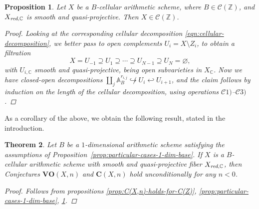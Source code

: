 \documentclass[10pt,a4paper,oneside,draft]{article}
\newcommand{\CC}{\mathbb{C}}
\newcommand{\ZZ}{\mathbb{Z}}
\renewcommand{\AA}{\mathbb{A}}
\renewcommand{\emptyset}{\varnothing}
\newcommand{\red}{\text{\it red}}
\theoremstyle{myplain}
\newtheorem{theorem}{Theorem}[section]
\newtheorem{proposition}[theorem]{Proposition}
\theoremstyle{mydefinition}
\numberwithin{equation}{section}
\begin{document}
\begin{proposition}
  \label{prop:cellular-schemes-in-C(Z)}
  Let $X$ be a $B$-cellular arithmetic scheme, where $B \in \mathcal{C} (\ZZ)$,
  and $X_{\red,\CC}$ is smooth and quasi-projective. Then
  $X \in \mathcal{C} (\ZZ)$.

  \begin{proof}
    Looking at the corresponding cellular decomposition
    \eqref{eqn:cellular-decomposition}, we better pass to open complements
    $U_i = X\setminus Z_i$, to obtain a filtration
    $$X = U_{-1} \supseteq U_1 \supseteq \cdots \supseteq U_{N-1} \supseteq U_N = \emptyset,$$
    with $U_{i,\CC}$ smooth and quasi-projective, being \emph{open}
    subvarieties in $X_\CC$. Now we have closed-open decompositions
    $\coprod_j \AA^{r_{i,j}}_B \not\hookrightarrow U_i \hookleftarrow U_{i+1}$,    
    and the claim follows by induction on the length of the cellular
    decomposition, using operations
    $\mathcal{C}1)$--$\mathcal{C}3)$.
  \end{proof}
\end{proposition}

As a corollary of the above, we obtain the following result, stated in the
introduction.

\begin{theorem}
  Let $B$ be a $1$-dimensional arithmetic scheme satisfying the assumptions of
  Proposition~\ref{prop:particular-cases-1-dim-base}. If $X$ is a $B$-cellular
  arithmetic scheme with smooth and quasi-projective fiber $X_{\red,\CC}$, then
  Conjectures $\mathbf{VO} (X,n)$ and $\mathbf{C} (X,n)$ hold
  unconditionally for any $n < 0$.

  \begin{proof}
    Follows from propositions
    \ref{prop:C(X,n)-holds-for-C(Z)},
    \ref{prop:particular-cases-1-dim-base},
    \ref{prop:cellular-schemes-in-C(Z)}.
  \end{proof}
\end{theorem}

\end{document}

